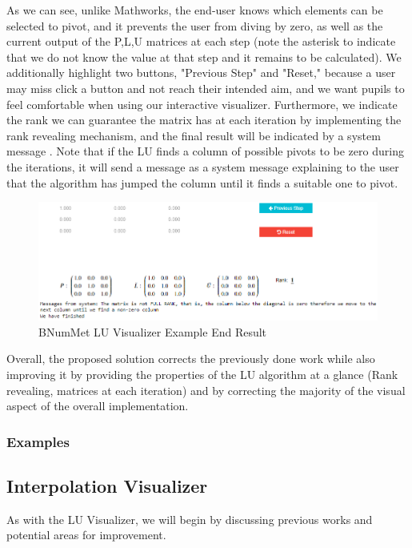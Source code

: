 As we can see, unlike Mathworks, the end-user knows which elements can be selected to pivot, and it prevents the user from diving by zero, as well as the current output of the P,L,U matrices at each step (note the asterisk to indicate that we do not know the value at that step and it remains to be calculated). We additionally highlight two buttons, "Previous Step" and "Reset," because a user may miss click a button and not reach their intended aim, and we want pupils to feel comfortable when using our interactive visualizer.
Furthermore, we indicate the rank we can guarantee the matrix has at each iteration by implementing the rank revealing mechanism, and the final result will be indicated by a system message . Note that if the LU finds a column of possible pivots to be zero during the iterations, it will send a message as a system message explaining to the user that the algorithm has jumped the column until it finds a suitable one to pivot.

\begin{figure}[H]
    \centering
    \includegraphics[width=\textwidth]{Include/Images/Thesis/Development/Visualizers/LU VISUALIZER/BNumMet.LU.Ex1.1.png}
    \caption{BNumMet LU Visualizer Example End Result}
    \label{fig:BNumMet Example End Result}
\end{figure}

Overall, the proposed solution corrects the previously done work while also improving it by providing the properties of the LU algorithm at a glance (Rank revealing, matrices at each iteration) and by correcting the majority of the visual aspect of the overall implementation.

\subsubsection{Examples}
	

\subsection{Interpolation Visualizer}
As with the LU Visualizer, we will begin by discussing previous works and potential areas for improvement.

